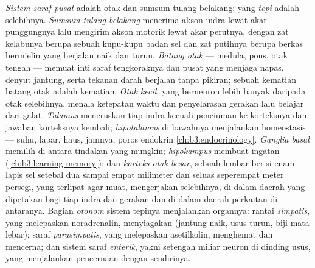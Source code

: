 \begin{definition}\label{def:b3:nervous-systems:plan}
%
%
\emph{Sistem saraf pusat} adalah otak dan sumsum tulang belakang; yang
\emph{tepi} adalah selebihnya. \emph{Sumsum tulang belakang} menerima
akson indra lewat akar punggungnya lalu mengirim akson motorik lewat
akar perutnya, dengan zat kelabunya berupa sebuah kupu-kupu badan sel dan
zat putihnya berupa berkas bermielin yang berjalan naik dan turun.
\emph{Batang otak} --- medula, pons, otak tengah --- memuat inti
saraf tengkoraknya dan pusat yang menjaga napas, denyut jantung, serta
tekanan darah berjalan tanpa pikiran; sebuah kematian batang otak adalah kematian.
\emph{Otak kecil}, yang berneuron lebih banyak daripada otak selebihnya, menala
ketepatan waktu dan penyelarasan gerakan lalu belajar dari galat.
\emph{Talamus} meneruskan tiap indra kecuali penciuman ke korteksnya dan
jawaban korteksnya kembali; \emph{hipotalamus} di bawahnya menjalankan
homeostasis --- suhu, lapar, haus, jamnya, poros endokrin
\cref{ch:b3:endocrinology}. \emph{Ganglia basal} memilih
di antara tindakan yang mungkin; \emph{hipokampus} membuat ingatan
(\cref{ch:b3:learning-memory}); dan \emph{korteks otak besar}, sebuah lembar
berisi enam lapis sel setebal dua sampai empat milimeter dan seluas seperempat
meter persegi, yang terlipat agar muat, mengerjakan selebihnya, di dalam daerah
yang dipetakan bagi tiap indra dan gerakan dan di dalam daerah perkaitan di
antaranya. Bagian \emph{otonom} sistem tepinya menjalankan organnya: rantai
\emph{simpatis}, yang melepaskan noradrenalin, menyiagakan (jantung naik,
usus turun, biji mata lebar); saraf \emph{parasimpatis}, yang melepaskan
asetilkolin, menghemat dan mencerna; dan sistem saraf \emph{enterik},
yakni setengah miliar neuron di dinding usus, yang menjalankan pencernaan
dengan sendirinya.
\end{definition}


